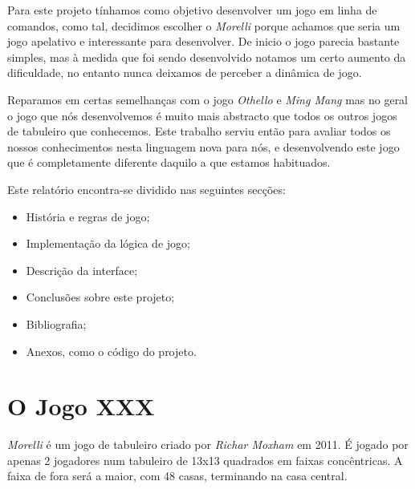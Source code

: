 \documentclass[a4paper]{article}
\begin{document}
\par Para este projeto tínhamos como objetivo desenvolver um jogo em linha de comandos, como tal, decidimos escolher o \textit{Morelli} porque achamos que seria um jogo apelativo e interessante para desenvolver. De inicio o jogo parecia bastante simples, mas à medida que foi sendo desenvolvido notamos um certo aumento da dificuldade, no entanto nunca deixamos de perceber a dinâmica de jogo.
\par Reparamos em certas semelhanças com o jogo \textit{Othello} e \textit{Ming Mang} mas no geral o jogo que nós desenvolvemos é muito mais abstracto que todos os outros jogos de tabuleiro que conhecemos. Este trabalho serviu então para avaliar todos os nossos conhecimentos nesta linguagem nova para nós, e desenvolvendo este jogo que é completamente diferente daquilo a que estamos habituados.
\par Este relatório encontra-se dividido nas seguintes secções: 
\begin{itemize}
	\item História e regras de jogo;
	\item Implementação da lógica de jogo;
	\item Descrição da interface;
	\item Conclusões sobre este projeto;
	\item Bibliografia;
	\item Anexos, como o código do projeto.
\end{itemize}	


\section{O Jogo XXX}

\par \textit{Morelli} é um jogo de tabuleiro criado por \textit{Richar Moxham} em 2011. É jogado por apenas 2 jogadores num tabuleiro de 13x13 quadrados em faixas concêntricas. A faixa de fora será a maior, com 48 casas, terminando na casa central. 
\end{document}
